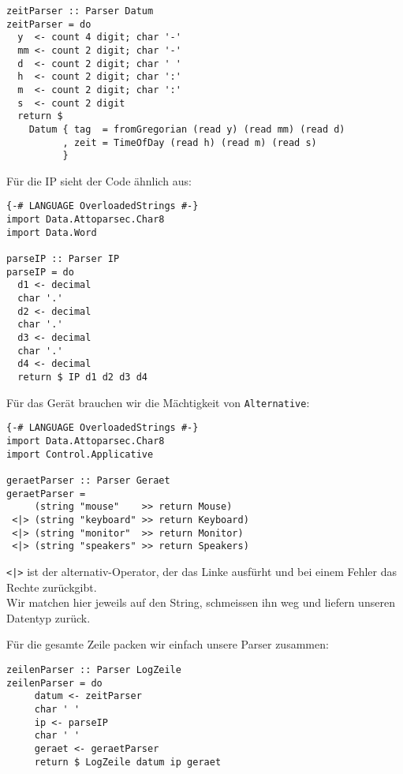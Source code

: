 \documentclass{beamer}
\begin{document}
\begin{frame}[fragile]
\begin{overprint}
\begin{verbatim}
zeitParser :: Parser Datum
zeitParser = do
  y  <- count 4 digit; char '-'
  mm <- count 2 digit; char '-'
  d  <- count 2 digit; char ' '
  h  <- count 2 digit; char ':'
  m  <- count 2 digit; char ':'
  s  <- count 2 digit
  return $
    Datum { tag  = fromGregorian (read y) (read mm) (read d)
          , zeit = TimeOfDay (read h) (read m) (read s)
          }
\end{verbatim}
\end{overprint}

\end{frame}

\begin{frame}[fragile]
Für die IP sieht der Code ähnlich aus:
\small
\begin{verbatim}
{-# LANGUAGE OverloadedStrings #-}
import Data.Attoparsec.Char8
import Data.Word

parseIP :: Parser IP
parseIP = do
  d1 <- decimal
  char '.'
  d2 <- decimal
  char '.'
  d3 <- decimal
  char '.'
  d4 <- decimal
  return $ IP d1 d2 d3 d4
\end{verbatim}
\normalsize
\end{frame}

\begin{frame}[fragile]
Für das Gerät brauchen wir die Mächtigkeit von \texttt{Alternative}:
\small
\begin{verbatim}
{-# LANGUAGE OverloadedStrings #-}
import Data.Attoparsec.Char8
import Control.Applicative

geraetParser :: Parser Geraet
geraetParser =
     (string "mouse"    >> return Mouse)
 <|> (string "keyboard" >> return Keyboard)
 <|> (string "monitor"  >> return Monitor)
 <|> (string "speakers" >> return Speakers)
\end{verbatim}
\normalsize
\pause
\texttt{<|>} ist der alternativ-Operator, der das Linke ausfürht und bei einem Fehler das Rechte zurückgibt.\\
\pause
Wir matchen hier jeweils auf den String, schmeissen ihn weg und liefern unseren Datentyp zurück.
\end{frame}

\begin{frame}[fragile]
Für die gesamte Zeile packen wir einfach unsere Parser zusammen:
\small
\begin{verbatim}
zeilenParser :: Parser LogZeile
zeilenParser = do
     datum <- zeitParser
     char ' '
     ip <- parseIP
     char ' '
     geraet <- geraetParser
     return $ LogZeile datum ip geraet
\end{verbatim}
\normalsize
\end{frame}
\end{document}
